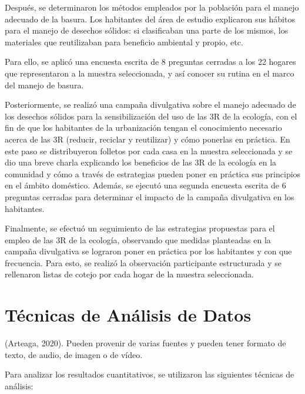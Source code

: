 Después, se determinaron los métodos empleados por la población para el manejo adecuado de la basura. Los habitantes del área de estudio explicaron sus hábitos para el manejo de desechos sólidos: si clasificaban una parte de los mismos, los materiales que reutilizaban para beneficio ambiental y propio, etc. 

Para ello, se aplicó una encuesta escrita de 8 preguntas cerradas a los 22 hogares que representaron a la muestra seleccionada, y así conocer su rutina en el marco del manejo de basura.

Posteriormente, se realizó una campaña divulgativa sobre el manejo adecuado de los desechos sólidos para la sensibilización del uso de las 3R de la ecología, con el fin de que los habitantes de la urbanización tengan el conocimiento necesario acerca de las 3R (reducir, reciclar y reutilizar) y cómo ponerlas en práctica. En este paso se distribuyeron folletos por cada casa en la muestra seleccionada y se dio una breve charla explicando los beneficios de las 3R de la ecología en la comunidad y cómo a través de estrategias pueden poner en práctica sus principios en el ámbito doméstico. Además, se ejecutó una segunda encuesta escrita de 6 preguntas cerradas para determinar el impacto de la campaña divulgativa en los habitantes.

Finalmente, se efectuó un seguimiento de las estrategias propuestas para el empleo de las 3R de la ecología, observando que medidas planteadas en la campaña divulgativa se lograron poner en práctica por los habitantes y con que frecuencia. Para esto, se realizó la observación participante estructurada y se rellenaron listas de cotejo por cada hogar de la muestra seleccionada. 

{\setlength{\parskip}{0cm}
\section{Técnicas de Análisis de Datos}

 (Arteaga, 2020). Pueden provenir de varias fuentes y pueden tener formato de texto, de audio, de imagen o de vídeo.
}

Para analizar los resultados cuantitativos, se utilizaron las siguientes técnicas de análisis:

